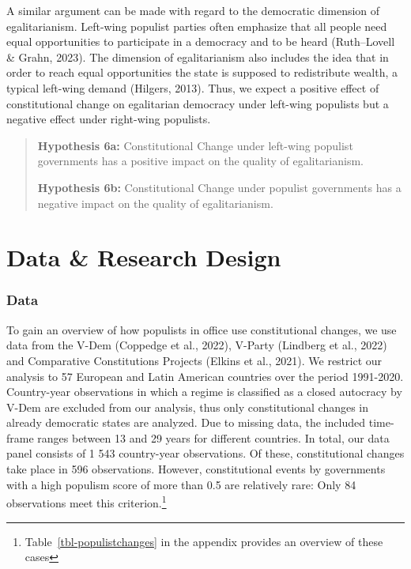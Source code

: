 \documentclass[
  abstract]{article}
\begin{document}
A similar argument can be made with regard to the democratic dimension
of egalitarianism. Left-wing populist parties often emphasize that all
people need equal opportunities to participate in a democracy and to be
heard (Ruth--Lovell \& Grahn, 2023). The dimension of egalitarianism
also includes the idea that in order to reach equal opportunities the
state is supposed to redistribute wealth, a typical left-wing demand
(Hilgers, 2013). Thus, we expect a positive effect of constitutional
change on egalitarian democracy under left-wing populists but a negative
effect under right-wing populists.

\begin{quote}
\textbf{Hypothesis 6a:} Constitutional Change under left-wing populist
governments has a positive impact on the quality of egalitarianism.

\textbf{Hypothesis 6b:} Constitutional Change under populist governments
has a negative impact on the quality of egalitarianism.
\end{quote}

\hypertarget{data-research-design}{%
\section{Data \& Research Design}\label{data-research-design}}

\hypertarget{data}{%
\subsubsection{Data}\label{data}}

To gain an overview of how populists in office use constitutional
changes, we use data from the V-Dem (Coppedge et al., 2022), V-Party
(Lindberg et al., 2022) and Comparative Constitutions Projects (Elkins
et al., 2021). We restrict our analysis to 57 European and Latin
American countries over the period 1991-2020. Country-year observations
in which a regime is classified as a closed autocracy by V-Dem are
excluded from our analysis, thus only constitutional changes in already
democratic states are analyzed. Due to missing data, the included
time-frame ranges between 13 and 29 years for different countries. In
total, our data panel consists of 1 543 country-year observations. Of
these, constitutional changes take place in 596 observations. However,
constitutional events by governments with a high populism score of more
than 0.5 are relatively rare: Only 84 observations meet this
criterion.\footnote{Table~\ref{tbl-populistchanges} in the appendix
  provides an overview of these cases}
\end{document}

